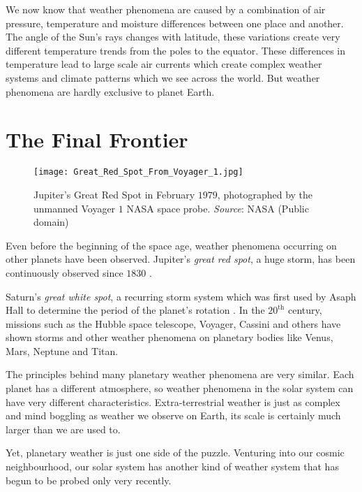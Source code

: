 We now know that weather phenomena are caused by a combination of air pressure, temperature and 
moisture differences between one place and another. The angle of the Sun's rays changes with 
latitude, these variations create very different temperature trends from the poles to the equator. 
These differences in temperature lead to large scale air currents which create complex weather 
systems and climate patterns which we see across the world. But weather phenomena are hardly 
exclusive to planet Earth.

\section*{The Final Frontier}

\begin{wrapfigure}{r}{0.35\textwidth}
    \centering\texttt{[image: Great\_Red\_Spot\_From\_Voyager\_1.jpg]}
    \caption{
        {\small 
            Jupiter's Great Red Spot in February $1979$, photographed by the unmanned 
            Voyager $1$ NASA space probe. \textit{Source}: NASA (Public domain)
        }
    }
    \label{fig:jupiter}
\end{wrapfigure}

Even before the beginning of the space age, weather phenomena occurring on other planets have been 
observed. Jupiter's \emph{great red spot}, a huge storm, has been continuously observed since 
$1830$ \citetext{see \citealp{britannicaRedSpot}}.

Saturn's \emph{great white spot}, a recurring storm system which was first used by Asaph Hall to 
determine the period of the planet's rotation \citep{wikisaturn}. In the $20^{\text{th}}$ century, 
missions such as the Hubble space telescope, Voyager, Cassini and others have shown storms and 
other weather phenomena on planetary bodies like Venus, Mars, Neptune and Titan. 

The principles behind many planetary weather phenomena are very similar. Each planet has a 
different atmosphere, so weather phenomena in the solar system can have very different 
characteristics. Extra-terrestrial weather is just as complex and mind boggling as weather we 
observe on Earth, its scale is certainly much larger than we are used to. 

Yet, planetary weather is just one side of the puzzle. Venturing into our cosmic neighbourhood, 
our solar system has another kind of weather system that has begun to be probed only very recently. 

